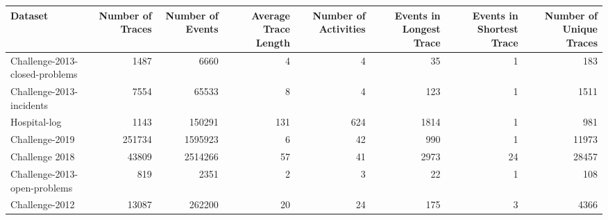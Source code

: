 \begin{tabular}{lrrrrrrr}
\toprule
Dataset & Number of Traces & Number of Events & Average Trace Length & Number of Activities & Events in Longest Trace & Events in Shortest Trace & Number of Unique Traces \\
\midrule
    Challenge-2013-closed-problems  & 1487      & 6660 & 4 & 4 & 35 & 1 & 183 \\
    Challenge-2013-incidents        & 7554      & 65533 & 8 & 4 & 123 & 1 & 1511 \\
    Hospital-log                    & 1143      & 150291 & 131 & 624 & 1814 & 1 & 981 \\
    Challenge-2019                  & 251734    & 1595923 & 6 & 42 & 990 & 1 & 11973 \\
    Challenge 2018                  & 43809     & 2514266 & 57 & 41 & 2973 & 24 & 28457 \\
    Challenge-2013-open-problems    & 819       & 2351 & 2 & 3 & 22 & 1 & 108 \\
    Challenge-2012                  & 13087     & 262200 & 20 & 24 & 175 & 3 & 4366 \\
\bottomrule
\end{tabular}
